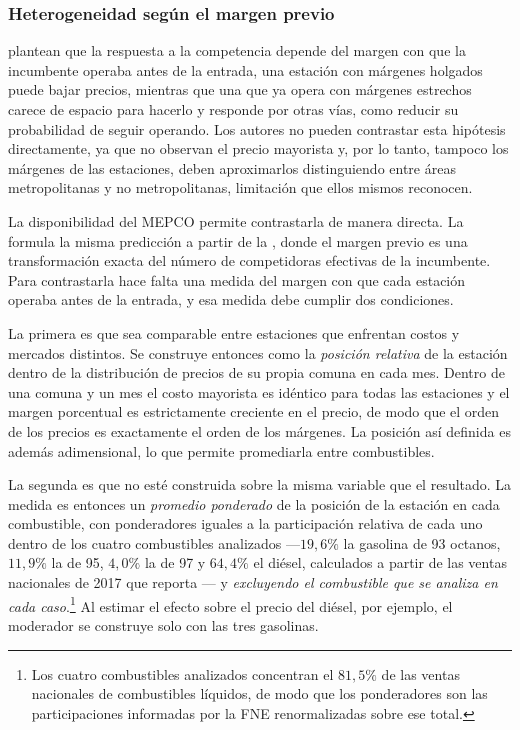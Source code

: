 \subsubsection{Heterogeneidad según el margen previo}

\textcite{KOH2022} plantean que la respuesta a la competencia depende del margen con que la incumbente operaba antes de la entrada, una estación con márgenes holgados puede bajar precios, mientras que una que ya opera con márgenes estrechos carece de espacio para hacerlo y responde por otras vías, como reducir su probabilidad de seguir operando. Los autores no pueden contrastar esta hipótesis directamente, ya que no observan el precio mayorista y, por lo tanto, tampoco los márgenes de las estaciones, deben aproximarlos distinguiendo entre áreas metropolitanas y no metropolitanas, limitación que ellos mismos reconocen.

La disponibilidad del MEPCO permite contrastarla de manera directa. La  formula la misma predicción a partir de la , donde el margen previo es una transformación exacta del número de competidoras efectivas de la incumbente. Para contrastarla hace falta una medida del margen con que cada estación operaba antes de la entrada, y esa medida debe cumplir dos condiciones.

La primera es que sea comparable entre estaciones que enfrentan costos y
mercados distintos. Se construye entonces como la \emph{posición relativa} de la
estación dentro de la distribución de precios de su propia comuna en cada mes.
Dentro de una comuna y un mes el costo mayorista es idéntico para todas las
estaciones y el margen porcentual es estrictamente creciente en el precio, de
modo que el orden de los precios es exactamente el orden de los márgenes. La
posición así definida es además adimensional, lo que permite promediarla entre
combustibles.

La segunda es que no esté construida sobre la misma variable que el resultado.
La medida es entonces un \emph{promedio ponderado} de la posición de la estación
en cada combustible, con ponderadores iguales a la participación relativa de cada
uno dentro de los cuatro combustibles analizados —$19{,}6\%$ la gasolina de 93
octanos, $11{,}9\%$ la de 95, $4{,}0\%$ la de 97 y $64{,}4\%$ el diésel,
calculados a partir de las ventas nacionales de 2017 que reporta
\textcite{FNE2025informe}— y \emph{excluyendo el combustible que se analiza en
cada caso}.\footnote{Los cuatro combustibles analizados concentran el $81{,}5\%$
de las ventas nacionales de combustibles líquidos, de modo que los ponderadores
son las participaciones informadas por la FNE renormalizadas sobre ese total.} Al estimar el efecto sobre el precio del diésel, por ejemplo, el
moderador se construye solo con las tres gasolinas.

